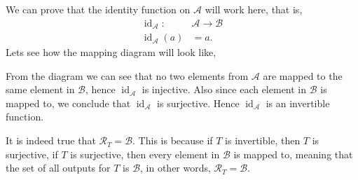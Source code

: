 \documentclass[12pt]{article} %
\begin{document}
\begin{qstn}
  We can prove that the identity function on $\mathcal{A}$ will work here, that is,
  \begin{align*}
    \operatorname{id}_\mathcal{A} \colon &\mathcal{A} \to \mathcal{B}\\
    \operatorname{id}_\mathcal{A}(a) &= a
  .\end{align*}
  Lets see how the mapping diagram will look like, 
    \begin{center}
  \end{center}
  From the diagram we can see that no two elements from $\mathcal{A}$ are mapped to the same element in $\mathcal{B}$, hence
  $\operatorname{id}_\mathcal{A}$ is injective. Also since each element in $\mathcal{B}$ is mapped to, we conclude that
  $\operatorname{id}_\mathcal{A}$ is surjective. Hence $\operatorname{id}_\mathcal{A}$ is an invertible function.
\end{qstn}

\begin{qstn}
  \begin{solution}
    It is indeed true that  $\mathcal{R}_T = \mathcal{B}$. This is because if $T$ is invertible, then $T$ is surjective,
    if $T$ is surjective, then every element in $\mathcal{B}$ is mapped to, meaning that the set of all outputs for $T$ is $\mathcal{B}$,
    in other words, $\mathcal{R}_T = \mathcal{B}$.
  \end{solution}
\end{qstn}
\end{document}
